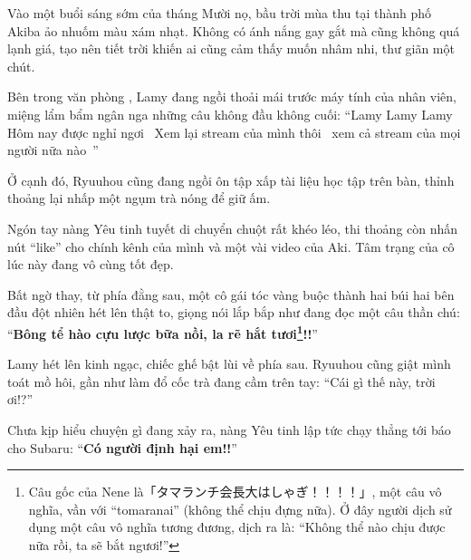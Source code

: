 \documentclass[../main.tex]{subfiles}
\begin{document}

Vào một buổi sáng sớm của tháng Mười nọ, bầu trời mùa thu tại thành phố Akiba ảo nhuốm màu xám nhạt. Không có ánh nắng gay gắt mà cũng không quá lạnh giá, tạo nên tiết trời khiến ai cũng cảm thấy muốn nhâm nhi, thư giãn một chút.

Bên trong văn phòng \hll, Lamy đang ngồi thoải mái trước máy tính của nhân viên, miệng lẩm bẩm ngân nga những câu không đầu không cuối: ``Lamy Lamy Lamy~{} Hôm nay được nghỉ ngơi~{} Xem lại stream của mình thôi~{} xem cả stream của mọi người nữa nào~{}''

Ở cạnh đó, Ryuuhou cũng đang ngồi ôn tập xấp tài liệu học tập trên bàn, thỉnh thoảng lại nhấp một ngụm trà nóng để giữ ấm.

Ngón tay nàng Yêu tinh tuyết di chuyển chuột rất khéo léo, thi thoảng còn nhấn nút ``like'' cho chính kênh của mình và một vài video của Aki. Tâm trạng của cô lúc này đang vô cùng tốt đẹp.

Bất ngờ thay, từ phía đằng sau, một cô gái tóc vàng buộc thành hai búi hai bên đầu đột nhiên hét lên thật to, giọng nói lắp bắp như đang đọc một câu thần chú: ``\textbf{Bông tể hào cựu lược bữa nồi, la rẽ hắt tươi\footnote{Câu gốc của Nene là「タマランチ会長大はしゃぎ！！！！」, một câu vô nghĩa, vần với ``tomaranai'' (không thể chịu đựng nữa). Ở đây người dịch sử dụng một câu vô nghĩa tương đương, dịch ra là: ``Không thể nào chịu được nữa rồi, ta sẽ bắt ngươi!''}!!}''


Lamy hét lên kinh ngạc, chiếc ghế bật lùi về phía sau. Ryuuhou cũng giật mình toát mồ hôi, gần như làm đổ cốc trà đang cầm trên tay: ``Cái gì thế này, trời ơi!?''

Chưa kịp hiểu chuyện gì đang xảy ra, nàng Yêu tinh lập tức chạy thẳng tới báo cho Subaru: ``\textbf{Có người định hại em!!}''
\end{document}
